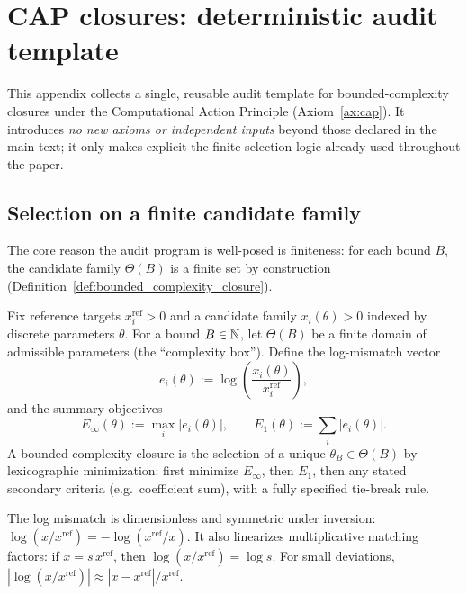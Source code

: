 \section{CAP closures: deterministic audit template}
\label{app:cap_audit_template}

This appendix collects a single, reusable audit template for bounded-complexity closures under the Computational Action Principle (Axiom~\ref{ax:cap}).
It introduces \emph{no new axioms or independent inputs} beyond those declared in the main text; it only makes explicit the finite selection logic already used throughout the paper.

\subsection{Selection on a finite candidate family}

The core reason the audit program is well-posed is finiteness: for each bound $B$, the candidate family $\Theta(B)$ is a finite set by construction (Definition~\ref{def:bounded_complexity_closure}).

\begin{definition}\label{def:bounded_complexity_closure}
Fix reference targets $x_i^{\mathrm{ref}}>0$ and a candidate family $x_i(\theta)>0$ indexed by discrete parameters $\theta$.
For a bound $B\in\mathbb{N}$, let $\Theta(B)$ be a finite domain of admissible parameters (the ``complexity box'').
Define the log-mismatch vector
\[
e_i(\theta):=\log\!\left(\frac{x_i(\theta)}{x_i^{\mathrm{ref}}}\right),
\]
and the summary objectives
\[
E_\infty(\theta):=\max_i |e_i(\theta)|,\qquad E_1(\theta):=\sum_i |e_i(\theta)|.
\]
A bounded-complexity closure is the selection of a unique $\theta_B\in\Theta(B)$ by lexicographic minimization:
first minimize $E_\infty$, then $E_1$, then any stated secondary criteria (e.g.\ coefficient sum), with a fully specified tie-break rule.
\end{definition}

\begin{remark}\label{rem:log_mismatch}
The log mismatch is dimensionless and symmetric under inversion: $\log(x/x^{\mathrm{ref}})=-\log(x^{\mathrm{ref}}/x)$.
It also linearizes multiplicative matching factors: if $x=s\,x^{\mathrm{ref}}$, then $\log(x/x^{\mathrm{ref}})=\log s$.
For small deviations, $|\log(x/x^{\mathrm{ref}})|\approx |x-x^{\mathrm{ref}}|/x^{\mathrm{ref}}$.
\end{remark}

